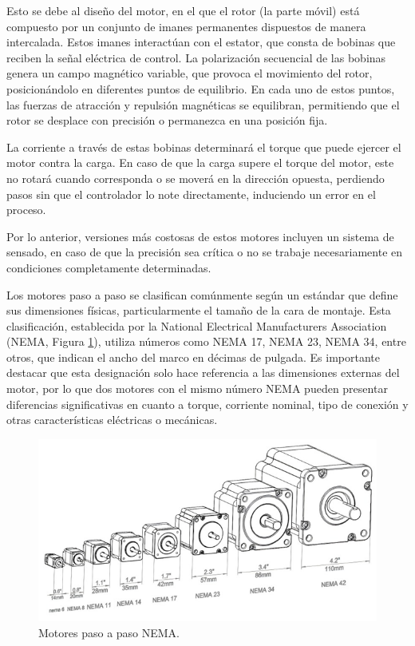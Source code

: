 Esto se debe al diseño del motor, en el que el rotor (la parte móvil) está compuesto por un conjunto de imanes permanentes dispuestos de manera intercalada. Estos imanes interactúan con el estator, que consta de bobinas que reciben la señal eléctrica de control. La polarización secuencial de las bobinas genera un campo magnético variable, que provoca el movimiento del rotor, posicionándolo en diferentes puntos de equilibrio. En cada uno de estos puntos, las fuerzas de atracción y repulsión magnéticas se equilibran, permitiendo que el rotor se desplace con precisión o permanezca en una posición fija.

La corriente a través de estas bobinas determinará el torque que puede ejercer el motor contra la carga. En caso de que la carga supere el torque del motor, este no rotará cuando corresponda o se moverá en la dirección opuesta, perdiendo pasos sin que el controlador lo note directamente, induciendo un error en el proceso.

Por lo anterior, versiones más costosas de estos motores incluyen un sistema de sensado, en caso de que la precisión sea crítica o no se trabaje necesariamente en condiciones completamente determinadas.

Los motores paso a paso se clasifican comúnmente según un estándar que define sus dimensiones físicas, particularmente el tamaño de la cara de montaje. Esta clasificación, establecida por la National Electrical Manufacturers Association (NEMA, Figura \ref{nmas}), utiliza números como NEMA 17, NEMA 23, NEMA 34, entre otros, que indican el ancho del marco en décimas de pulgada. Es importante destacar que esta designación solo hace referencia a las dimensiones externas del motor, por lo que dos motores con el mismo número NEMA pueden presentar diferencias significativas en cuanto a torque, corriente nominal, tipo de conexión y otras características eléctricas o mecánicas.

\begin{figure}[h!]
    \centering
    \includegraphics[width=0.9\linewidth]{imgs/nemas.png}
    \caption{Motores paso a paso NEMA.}
    \label{nmas}
\end{figure}

